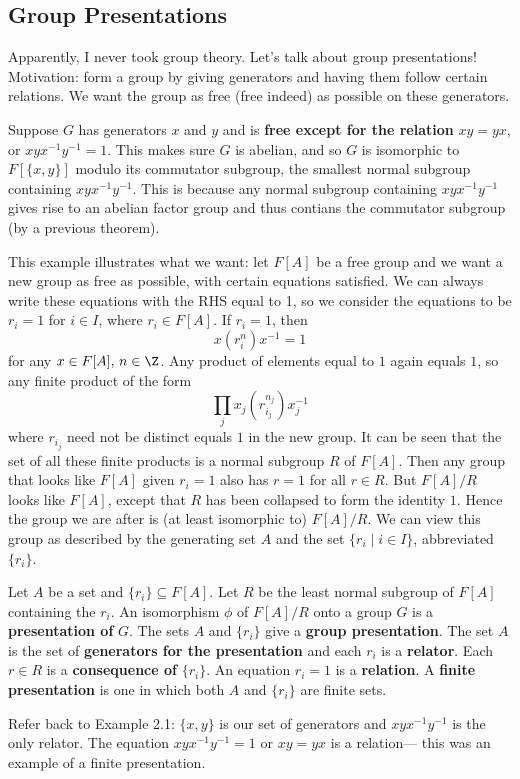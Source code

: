 \subsection{Group Presentations}
Apparently, I never took group theory. Let's talk about group presentations! 
\orbreak
Motivation: form a group by giving generators and having them follow certain relations. We want the group as free (free indeed) as possible on these generators.
\begin{example}
    Suppose $G$ has generators $x$ and $y$ and is \textbf{free except for the relation} $xy=yx$, or $xyx^{-1}y^{-1}=1$. This makes sure $G$ is abelian, and so $G$ is isomorphic to $F[\{x,y\} ]$ modulo its commutator subgroup, the smallest normal subgroup containing $xyx^{-1}y^{-1}$. This is because any normal subgroup containing $xyx^{-1}y^{-1}$ gives rise to an abelian factor group and thus contians the commutator subgroup (by a previous theorem).
\end{example}
This example illustrates what we want: let $F[A]$ be a free group and we want a new group as free as possible, with certain equations satisfied. We can always write these equations with the RHS equal to 1, so we consider the equations to be $r_i=1$ for $i\in I$, where $r_i\in F[A]$. If $r_i=1$, then \[
    x(r_i^n)x^{-1}=1
\] for any $x\in F[A],\, n\in \Z$. Any product of elements equal to $1$ again equals $1$, so any finite product of the form \[
\prod_{j}^{} x_{j}\left( r_{i_j}^{n_j} \right) x_{j}^{-1}
\] where $r_{i_j}$ need not be distinct equals $1$ in the new group. It can be seen that the set of all these finite products is a normal subgroup $R$ of $F[A]$. Then any group that looks like $F[A]$ given $r_i=1$ also has $r=1$ for all $r\in R$. But $F[A]/R$ looks like $F[A]$, except that $R$ has been collapsed to form the identity $1$. Hence the group we are after is (at least isomorphic to) $F[A]/R$. We can view this group as described by the generating set $A$ and the set $\{r_i \mid i\in I\} $, abbreviated $\{r_i\} $.
\begin{definition}
    Let $A$ be a set and $\{r_i\} \subseteq F[A]$. Let $R$ be the least normal subgroup of $F[A]$ containing the $r_i$. An isomorphism $\phi$ of $F[A]/R$ onto a group $G$ is a \textbf{presentation of} $G$. The sets $A$ and $\{r_i\} $ give a \textbf{group presentation}. The set $A$ is the set of \textbf{generators for the presentation} and each $r_i$ is a \textbf{relator}. Each $r\in R$ is a \textbf{consequence of} $\{r_i\} $. An equation $r_i=1$ is a \textbf{relation}. A \textbf{finite presentation} is one in which both $A$ and $\{r_i\} $ are finite sets.
\end{definition}
Refer back to Example 2.1: $\{x,y\}$ is our set of generators and $xyx^{-1}y^{-1}$ is the only relator. The equation $xyx^{-1}y^{-1}=1$ or $xy=yx$ is a relation— this was an example of a finite presentation.

